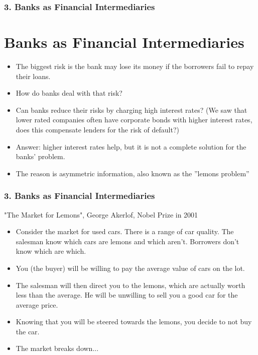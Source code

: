 \documentclass{beamer}
\begin{document}
\begin{frame}[t]
    \frametitle{3. Banks as Financial Intermediaries}
    \section{Banks as Financial Intermediaries}

    \begin{itemize}
    
        \item The biggest risk is the bank may lose its money if the borrowers fail to repay their loans.
        \item How do banks deal with that risk?
        \item Can banks reduce their risks by charging high interest rates?    (We saw that lower rated companies often have corporate bonds with higher interest rates, does this compensate lenders for the risk of default?)
        \item Answer: higher interest rates help, but it is not a complete solution for the banks’ problem.
        \item The reason is asymmetric information, also known as the ”lemons problem”
    \end{itemize}

\end{frame}

\begin{frame}[t]
    \frametitle{3. Banks as Financial Intermediaries}

    "The Market for Lemons", George Akerlof, Nobel Prize in 2001

    \begin{itemize}
        \item Consider the market for used cars.   There is a range of car quality.   The salesman know which cars are lemons and which aren’t.   Borrowers don’t know which are which.
        \item You (the buyer) will be willing to pay the average value of cars on the lot.
        \item The salesman will then direct you to the lemons, which are actually worth less than the average.   He will be unwilling to sell you a good car for the average price.
        \item Knowing that you will be steered towards the lemons, you decide to not buy the car.
        \item The market breaks down...
    \end{itemize}
\end{frame}
\end{document}
